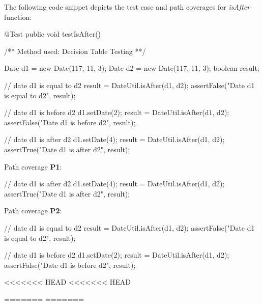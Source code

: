 \documentclass[fontsize=12pt,paper=letter,twoside]{scrartcl}
\begin{document}
\noindent The following code snippet depicts the test case and path coverages for \emph{isAfter} function:
\begin{code}
	@Test
	public void testIsAfter() {
		/** Method used: Decision Table Testing **/
		
		Date d1 = new Date(117, 11, 3);
		Date d2 = new Date(117, 11, 3);
		boolean result;
		
		// date d1 is equal to d2
		result = DateUtil.isAfter(d1, d2);
		assertFalse("Date d1 is equal to d2", result);
		
		// date d1 is before d2
		d1.setDate(2);
		result = DateUtil.isAfter(d1, d2);
		assertFalse("Date d1 is before d2", result);
		
		// date d1 is after d2
		d1.setDate(4);
		result = DateUtil.isAfter(d1, d2);
		assertTrue("Date d1 is after d2", result);
	}
\end{code}

\newpage
\noindent Path coverage \textbf{P1}:
\begin{code}
		// date d1 is after d2
		d1.setDate(4);
		result = DateUtil.isAfter(d1, d2);
		assertTrue("Date d1 is after d2", result);
\end{code}

\noindent Path coverage \textbf{P2}:
\begin{code}
		// date d1 is equal to d2
		result = DateUtil.isAfter(d1, d2);
		assertFalse("Date d1 is equal to d2", result);
		
		// date d1 is before d2
		d1.setDate(2);
		result = DateUtil.isAfter(d1, d2);
		assertFalse("Date d1 is before d2", result);
\end{code}

<<<<<<< HEAD
<<<<<<< HEAD

=======
=======
\end{document}
